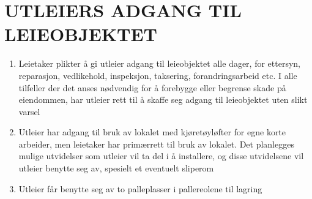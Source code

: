 \section{UTLEIERS ADGANG TIL LEIEOBJEKTET}


    \begin{enumerate}


        \item Leietaker plikter å gi utleier adgang til leieobjektet alle dager, for ettersyn,
        reparasjon, vedlikehold, inspeksjon, taksering, forandringsarbeid etc.
        I alle tilfeller der det anses nødvendig for å forebygge eller begrense skade på eiendommen, har
        utleier rett til å skaffe seg adgang til leieobjektet uten slikt varsel

        \item Utleier har adgang til bruk av lokalet med kjøretøyløfter for egne korte arbeider, men leietaker har primærrett til bruk av lokalet. Det planlegges mulige utvidelser som utleier vil ta del i å installere, og disse utvidelsene vil utleier benytte seg av, spesielt et eventuelt sliperom

        \item Utleier får benytte seg av to palleplasser i pallereolene til lagring

    \end{enumerate}
